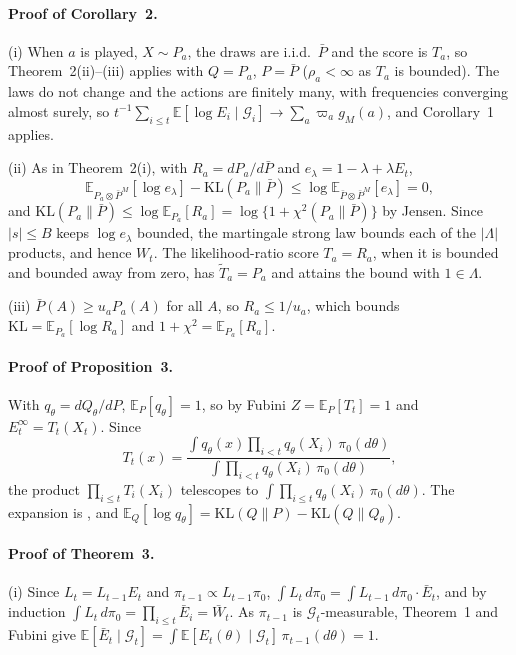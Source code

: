 \documentclass[11pt]{article}
\newcommand{\E}{\mathbb{E}}
\newcommand{\KL}{\mathrm{KL}}
\newcommand{\G}{\mathcal{G}}
\theoremstyle{remark}
\begin{document}
\paragraph{Proof of Corollary~2.}
(i) When $a$ is played, $X \sim P_a$, the draws are i.i.d.\ $\bar P$ and the
score is $T_a$, so Theorem~2(ii)--(iii) applies with $Q = P_a$,
$P = \bar P$ ($\rho_a < \infty$ as $T_a$ is bounded). The laws do not change and
the actions are finitely many, with frequencies converging almost surely, so
$t^{-1}\sum_{i \le t}\E[\log E_i \mid \G_i] \to \sum_a \varpi_a g_M(a)$, and
Corollary~1 applies.

(ii) As in Theorem~2(i), with $R_a = dP_a/d\bar P$ and
$e_\lambda = 1 - \lambda + \lambda E_t$,
\[
\E_{P_a \otimes \bar P^M}[\log e_\lambda] - \KL(P_a\|\bar P)
\le \log \E_{\bar P \otimes \bar P^M}[e_\lambda] = 0,
\]
and $\KL(P_a\|\bar P) \le \log\E_{P_a}[R_a] = \log\{1 + \chi^2(P_a\|\bar P)\}$ by
Jensen. Since $|s| \le B$ keeps $\log e_\lambda$ bounded, the martingale strong
law bounds each of the $|\Lambda|$ products, and hence $W_t$. The
likelihood-ratio score $T_a = R_a$, when it is bounded and bounded away from
zero, has $\tilde T_a = P_a$ and attains the bound with $1 \in \Lambda$.

(iii) $\bar P(A) \ge u_a P_a(A)$ for all $A$, so $R_a \le 1/u_a$, which bounds
$\KL = \E_{P_a}[\log R_a]$ and $1 + \chi^2 = \E_{P_a}[R_a]$.

\paragraph{Proof of Proposition~3.}
With $q_\theta = dQ_\theta/dP$, $\E_P[q_\theta] = 1$, so by Fubini
$Z = \E_P[T_t] = 1$ and $E_t^\infty = T_t(X_t)$. Since
\[
T_t(x) = \frac{\int q_\theta(x) \prod_{i<t} q_\theta(X_i)\,\pi_0(d\theta)}
{\int \prod_{i<t} q_\theta(X_i)\,\pi_0(d\theta)},
\]
the product $\prod_{i \le t} T_i(X_i)$ telescopes to
$\int \prod_{i \le t} q_\theta(X_i)\,\pi_0(d\theta)$. The expansion is
\citet{clarke1990information}, and $\E_Q[\log q_\theta] = \KL(Q\|P) - \KL(Q\|Q_\theta)$.

\paragraph{Proof of Theorem~3.}
(i) Since $L_t = L_{t-1}E_t$ and $\pi_{t-1} \propto L_{t-1}\pi_0$,
$\int L_t\, d\pi_0 = \int L_{t-1}\,d\pi_0 \cdot \bar E_t$, and by induction
$\int L_t\,d\pi_0 = \prod_{i \le t}\bar E_i = \bar W_t$. As $\pi_{t-1}$ is
$\G_t$-measurable, Theorem~1 and Fubini give
$\E[\bar E_t \mid \G_t] = \int \E[E_t(\theta) \mid \G_t]\,\pi_{t-1}(d\theta) = 1$.
\end{document}
